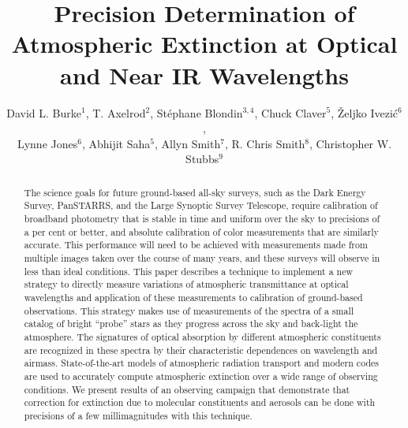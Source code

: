 \documentclass[manuscript]{aastex}
\begin{document}
\title{Precision Determination of Atmospheric Extinction at Optical and Near IR Wavelengths}

\author{David L. Burke$^1$, T. Axelrod$^2$, St\'ephane Blondin$^{3,4}$, Chuck Claver$^5$, \v{Z}eljko Ivezi\'{c}$^6$, \\
        Lynne Jones$^6$, Abhijit Saha$^5$, Allyn Smith$^7$, R. Chris Smith$^8$, Christopher W. Stubbs$^9$}

\begin{abstract}
The science goals for future ground-based all-sky surveys, such as the Dark Energy Survey, PanSTARRS, and the Large Synoptic Survey Telescope,
require calibration of broadband photometry that is stable in time and uniform over the sky to precisions of a per cent or better, 
and absolute calibration of color measurements that are similarly accurate.
This performance will need to be achieved with measurements made from multiple images taken over the course of many years,
and these surveys will observe in less than ideal conditions.
This paper describes a technique to implement a new strategy to directly measure
variations of atmospheric transmittance at optical wavelengths and application of these measurements to calibration of ground-based observations.
This strategy makes use of measurements of the spectra of a small catalog of bright ``probe'' stars
as they progress across the sky and back-light the atmosphere.
The signatures of optical absorption by different atmospheric constituents are recognized in these spectra 
by their characteristic dependences on wavelength and airmass. 
State-of-the-art models of atmospheric radiation transport and modern codes are used
to accurately compute atmospheric extinction over a wide range of observing conditions.
We present results of an observing campaign
that demonstrate that correction for extinction due to molecular constituents and aerosols can be
done with precisions of a few millimagnitudes with this technique.
\end{abstract}
\end{document}
